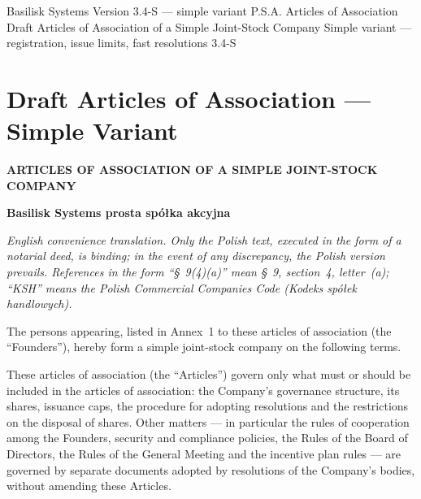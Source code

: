 \documentclass[12pt,a4paper]{report}
\newcommand{\CompanyFull}{Basilisk Systems prosta spółka akcyjna}
\begin{document}

\BusinessPlanTitlePage
  {Basilisk Systems}
  {Version 3.4-S --- simple variant}
  {P.S.A. Articles of Association}
  {Draft Articles of Association of a Simple Joint-Stock Company}
  {Simple variant --- registration, issue limits, fast resolutions}
  {3.4-S}

\tableofcontents
\newpage

\chapter*{Draft Articles of Association --- Simple Variant}

\begin{center}
{\Large\bfseries ARTICLES OF ASSOCIATION OF A SIMPLE JOINT-STOCK COMPANY}\par
\vspace{0.25cm}
{\LARGE\bfseries \CompanyFull}\par
\vspace{0.6cm}
\end{center}

\begin{center}
\small\itshape English convenience translation. Only the Polish text, executed in the form of a notarial deed, is binding; in the event of any discrepancy, the Polish version prevails. References in the form ``\S~9(4)(a)'' mean \S~9, section~4, letter~(a); ``KSH'' means the Polish Commercial Companies Code (\textit{Kodeks spółek handlowych}).
\end{center}

The persons appearing, listed in Annex~1 to these articles of association (the ``Founders''), hereby form a simple joint-stock company on the following terms.

These articles of association (the ``Articles'') govern only what must or should be included in the articles of association: the Company's governance structure, its shares, issuance caps, the procedure for adopting resolutions and the restrictions on the disposal of shares. Other matters --- in particular the rules of cooperation among the Founders, security and compliance policies, the Rules of the Board of Directors, the Rules of the General Meeting and the incentive plan rules --- are governed by separate documents adopted by resolutions of the Company's bodies, without amending these Articles.
\end{document}
